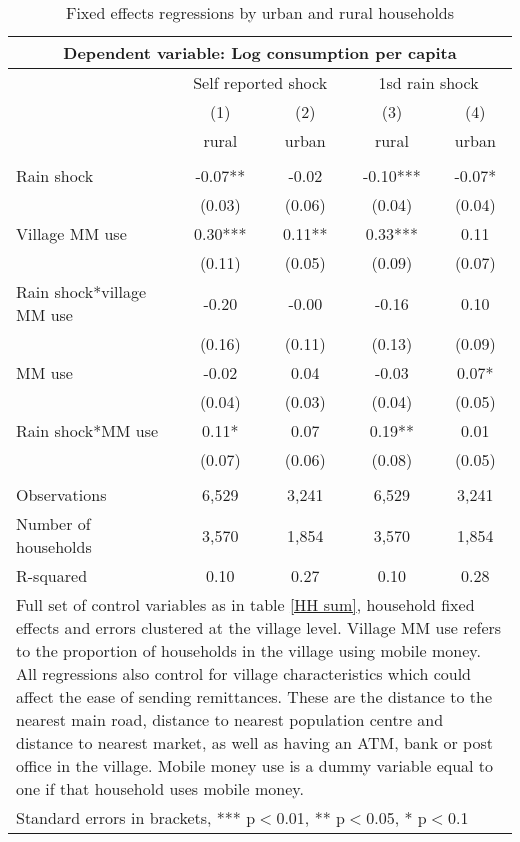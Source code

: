 \begin{table}
\centering
\caption{Fixed effects regressions by urban and rural  households} \label{urban rural}
\begin{tabular}{lcccc}
\multicolumn{5}{c}{Dependent variable: Log consumption per capita} \\ \hline
& \multicolumn{2}{c}{Self reported shock} & \multicolumn{2}{c}{1sd rain shock} \\
 & (1) & (2) & (3) & (4) \\
 & rural & urban& rural & urban  \\ \hline
 &  &  &  &  \\
Rain shock & -0.07** & -0.02 &   -0.10*** & -0.07*   \\
 & (0.03) & (0.06)  & (0.04) & (0.04)  \\
Village MM use & 0.30*** & 0.11** & 0.33*** & 0.11 \\
 & (0.11) & (0.05) & (0.09) & (0.07) \\
Rain shock*village MM use & -0.20 & -0.00 & -0.16 & 0.10  \\
 & (0.16) & (0.11) & (0.13) & (0.09)  \\
MM use & -0.02 & 0.04 & -0.03 & 0.07* \\
 & (0.04) & (0.03) & (0.04) & (0.05) \\
Rain shock*MM use & 0.11* & 0.07 & 0.19** & 0.01  \\
 & (0.07) & (0.06) & (0.08) & (0.05)  \\
 &  &  &  &  \\
Observations & 6,529 & 3,241 & 6,529 & 3,241 \\
Number of households & 3,570 & 1,854 & 3,570 & 1,854 \\
R-squared & 0.10 & 0.27 & 0.10 & 0.28 \\\hline
\multicolumn{5}{p{11cm}}{Full set of control variables as in table \ref{HH sum}, household fixed effects and errors clustered at the village level. Village MM use refers to the proportion of households in the village using mobile money. All regressions also control for village characteristics which could affect the ease of sending remittances. These are the distance to the nearest main road, distance to nearest population centre and distance to nearest market, as well as having an ATM, bank or post office in the village. Mobile money use is a dummy variable equal to one if that household uses mobile money.} \\
\multicolumn{5}{l}{ Standard errors in brackets, *** p$<$0.01, ** p$<$0.05, * p$<$0.1} \\
\end{tabular}
\end{table}